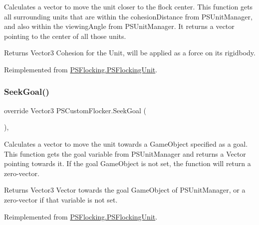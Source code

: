 Calculates a vector to move the unit closer to the flock center. This function gets all surrounding units that are within the cohesion\+Distance from P\+S\+Unit\+Manager, and also within the viewing\+Angle from P\+S\+Unit\+Manager. It returns a vector pointing to the center of all those units. 

\begin{DoxyReturn}{Returns}
Vector3 Cohesion for the Unit, will be applied as a force on its rigidbody. 
\end{DoxyReturn}


Reimplemented from \hyperlink{class_p_s_flocking_1_1_p_s_flocking_unit_a87ad210603e8d8451e14a4de8af9cba0}{P\+S\+Flocking.\+P\+S\+Flocking\+Unit}.

\mbox{\label{class_p_s_custom_flocker_a43590dd2fdf5f37d2116cf08473375c7}} 
\subsubsection{\texorpdfstring{Seek\+Goal()}{SeekGoal()}}
{\footnotesize\ttfamily override Vector3 P\+S\+Custom\+Flocker.\+Seek\+Goal (\begin{DoxyParamCaption}{ }\end{DoxyParamCaption})\hspace{0.3cm}{\ttfamily [protected]}, {\ttfamily [virtual]}}



Calculates a vector to move the unit towards a Game\+Object specified as a goal. This function gets the goal variable from P\+S\+Unit\+Manager and returns a Vector pointing towards it. If the goal Game\+Object is not set, the function will return a zero-\/vector. 

\begin{DoxyReturn}{Returns}
Vector3 Vector towards the goal Game\+Object of P\+S\+Unit\+Manager, or a zero-\/vector if that variable is not set. 
\end{DoxyReturn}


Reimplemented from \hyperlink{class_p_s_flocking_1_1_p_s_flocking_unit_ab2ce12145c79e5e179f841412ed2febb}{P\+S\+Flocking.\+P\+S\+Flocking\+Unit}.

\mbox{\label{class_p_s_custom_flocker_a2ab0990e603a5102fc80dafee1333c7c}} 
